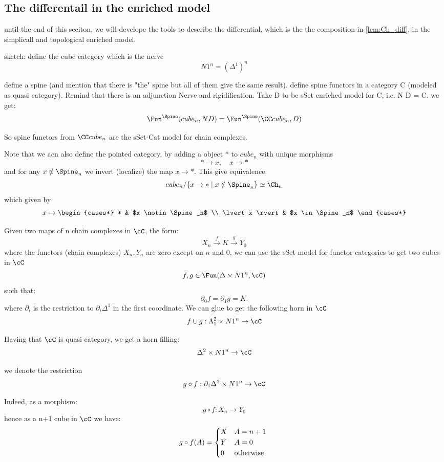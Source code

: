 \subsection{The differentail in the enriched model}
until the end of this seciton, we will develope the tools to describe the differential, which is the the composition in \cref{lem:Ch_diff}, in the simplicall and topological enriched model.

sketch:
define the cube category which is the nerve
\[
    N 1^n = (\Delta^1)^n
\]

define a spine (and mention that there is "the" spine but all of them give the same result).
define spine functors in a category C (modeled as quasi category).
Remind that there is an adjunction Nerve and rigidification.
Take D to be sSet enriched model for C, i.e. N D = C.
we get:
\[
    \Fun^{\Spine} (cube_n, N D) = \Fun^{\Spine} (\CC cube_n, D)
\]

So spine functors from $\CC cube_n$ are the sSet-Cat model for chain complexes.

Note that we acn also define the pointed category, by adding a object $*$ to $cube_n$ with unique morphisms
\[
    * \to x, \quad x \to *
\]
and for any $x \notin \Spine_n$ we invert (localize) the map $x \to *$.
This give equivalence:
\[
    cube_n / \{x \to * \mid x \notin \Spine_n\} \simeq \Ch_n
\]
which given by
\[
    x \mapsto \begin{cases*}
        *               & $x \notin \Spine_n$ \\
        \lvert x \rvert & $x \in \Spine_n$
    \end{cases*}
\]

Given two maps of n chain complexes in $\cC$, the form:
\[
    X_n \xrightarrow{f} K \xrightarrow{g} Y_0
\]
where the functors (chain complexes) $X_n, Y_n$ are zero except on $n$ and $0$, we can use the sSet model for functor categories to get two cubes in $\cC$
\[
    f,g \in \Fun(\Delta \times N 1^n, \cC)
\]
such that:
\[
    \partial_0 f = \partial_1 g = K.
\]
where $\partial_i$ is the restriction to $\partial_i \Delta^1$ in the first coordinate.
We can glue to get the following horn in $\cC$
\[
    f\cup g : \Lambda^2_1 \times N 1^n \to \cC
\]

Having that $\cC$ is quasi-category, we get a horn filling:
\[
    \Delta^2 \times N 1^n \to \cC
\]

we denote the restriction
\[
    g \circ f : \partial_1 \Delta^2 \times N 1^n \to \cC
\]

Indeed, as a morphism:
\[
    g \circ f : X_n \to Y_0
\]
hence as a n+1 cube in $\cC$ we have:
\[
    g \circ f (A) = \begin{cases*}
        X & $A = n+1$ \\
        Y & $A = 0$   \\
        0 & otherwise
    \end{cases*}
\]

